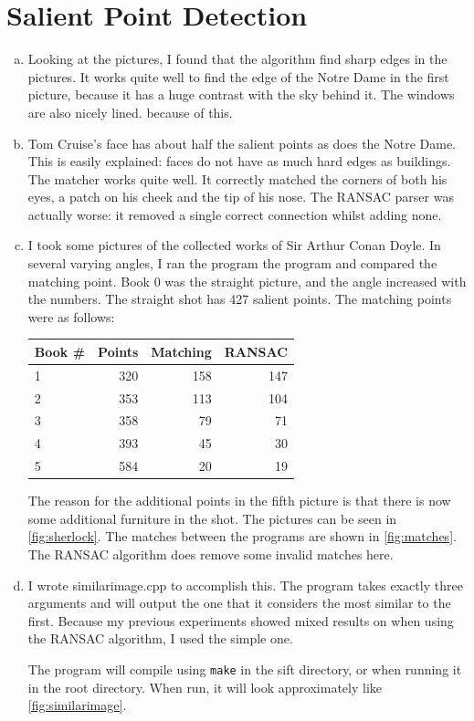 \documentclass[10pt,a4paper]{article}
\begin{document}
\section{Salient Point Detection}
\begin{enumerate}[a)]
	\item Looking at the pictures, I found that the algorithm find sharp edges in the pictures. It works quite well to find the edge of the Notre Dame in the first picture, because it has a huge contrast with the sky behind it. The windows are also nicely lined. because of this.

	\item Tom Cruise's face has about half the salient points as does the Notre Dame. This is easily explained: faces do not have as much hard edges as buildings. The matcher works quite well. It correctly matched the corners of both his eyes, a patch on his cheek and the tip of his nose. The RANSAC parser was actually worse: it removed a single correct connection whilst adding none.

	\item I took some pictures of the collected works of Sir Arthur Conan Doyle. In several varying angles, I ran the program the program and compared the matching point. Book 0 was the straight picture, and the angle increased with the numbers. The straight shot has 427 salient points. The matching points were as follows:
	\begin{center}
	\begin{tabular}{l|r|r|r}
	Book \# & Points & Matching & RANSAC\\
	\hline
	1 & 320 & 158 & 147 \\
	2 & 353 & 113 & 104 \\
	3 & 358 & 79 & 71 \\
	4 & 393 & 45 & 30 \\
	5 & 584 & 20 & 19
	\end{tabular}
	\end{center}
	The reason for the additional points in the fifth picture is that there is now some additional furniture in the shot. The pictures can be seen in \autoref{fig:sherlock}. The matches between the programs are shown in \autoref{fig:matches}. The RANSAC algorithm does remove some invalid matches here.

	\item I wrote similarimage.cpp to accomplish this. The program takes exactly three arguments and will output the one that it considers the most similar to the first. Because my previous experiments showed mixed results on when using the RANSAC algorithm, I used the simple one.

	The program will compile using \texttt{make} in the sift directory, or when running it in the root directory. When run, it will look approximately like \autoref{fig:similarimage}.
\end{enumerate}
\end{document}
